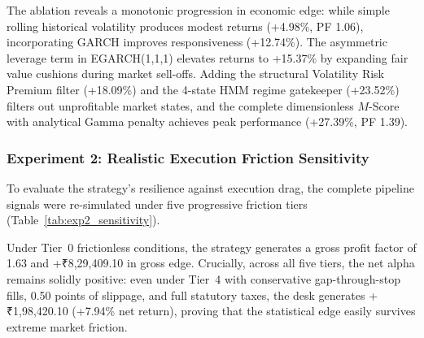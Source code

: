 \documentclass[journal]{IEEEtran}
\begin{document}
The ablation reveals a monotonic progression in economic edge: while simple rolling historical volatility produces modest returns (+4.98\%, PF 1.06), incorporating GARCH improves responsiveness (+12.74\%). The asymmetric leverage term in EGARCH(1,1,1) elevates returns to +15.37\% by expanding fair value cushions during market sell-offs. Adding the structural Volatility Risk Premium filter (+18.09\%) and the 4-state HMM regime gatekeeper (+23.52\%) filters out unprofitable market states, and the complete dimensionless $M$-Score with analytical Gamma penalty achieves peak performance (+27.39\%, PF 1.39).

\subsubsection{Experiment 2: Realistic Execution Friction Sensitivity}
To evaluate the strategy's resilience against execution drag, the complete pipeline signals were re-simulated under five progressive friction tiers (Table~\ref{tab:exp2_sensitivity}).

\begin{table}[!t]
\renewcommand{\arraystretch}{1.15}
\caption{Experiment 2: Realistic Execution Sensitivity (375 Sessions)}
\label{tab:exp2_sensitivity}
\centering
{}
\end{table}

Under Tier~0 frictionless conditions, the strategy generates a gross profit factor of 1.63 and +₹8,29,409.10 in gross edge. Crucially, across all five tiers, the net alpha remains solidly positive: even under Tier~4 with conservative gap-through-stop fills, 0.50 points of slippage, and full statutory taxes, the desk generates +₹1,98,420.10 (+7.94\% net return), proving that the statistical edge easily survives extreme market friction.
\end{document}

